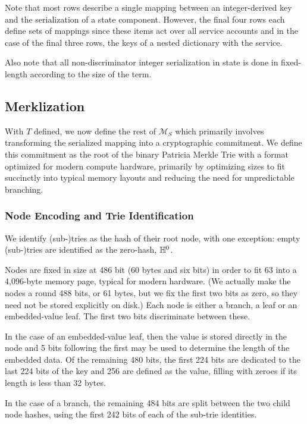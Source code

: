 Note that most rows describe a single mapping between an integer-derived key and the serialization of a state component. However, the final four rows each define sets of mappings since these items act over all service accounts and in the case of the final three rows, the keys of a nested dictionary with the service.

Also note that all non-discriminator integer serialization in state is done in fixed-length according to the size of the term.

\subsection{Merklization}

With $T$ defined, we now define the rest of $\mathcal{M}_S$ which primarily involves transforming the serialized mapping into a cryptographic commitment. We define this commitment as the root of the binary Patricia Merkle Trie with a format optimized for modern compute hardware, primarily by optimizing sizes to fit succinctly into typical memory layouts and reducing the need for unpredictable branching.

\subsubsection{Node Encoding and Trie Identification}
We identify (sub-)tries as the hash of their root node, with one exception: empty (sub-)tries are identified as the zero-hash, $\mathbb{H}^0$.

Nodes are fixed in size at 486 bit (60 bytes and six bits) in order to fit 63 into a 4,096-byte memory page, typical for modern hardware. (We actually make the nodes a round 488 bits, or 61 bytes, but we fix the first two bits as zero, so they need not be stored explicitly on disk.) Each node is either a branch, a leaf or an embedded-value leaf. The first two bits discriminate between these.

In the case of an embedded-value leaf, then the value is stored directly in the node and 5 bits following the first may be used to determine the length of the embedded data. Of the remaining 480 bits, the first 224 bits are dedicated to the last 224 bits of the key and 256 are defined as the value, filling with zeroes if its length is less than 32 bytes.

In the case of a branch, the remaining 484 bits are split between the two child node hashes, using the first 242 bits of each of the sub-trie identities.

